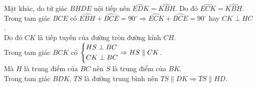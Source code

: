 \begin{ex}
{\begin{enumerate}
		Mặt khác, do tứ giác $BHDE$ nội tiếp nên $\widehat{EDK}=\widehat{KBH}$. Do đó $\widehat{ECK}=\widehat{KBH}$.\\
		Trong tam giác $BCE$ có $\widehat{EBH}+\widehat{BCE}=90^\circ \Rightarrow \widehat{ECK}+\widehat{BCE}=90^\circ$ hay $CK \perp HC$.\\
		Do đó $CK$ là tiếp tuyến của đường tròn đường kính $CH$.\\
		Trong tam giác $BCK$ có $\left\{\begin{aligned}&HS\perp BC\\&CK \perp BC\end{aligned}\right. \Rightarrow HS \parallel CK$.\\
		Mà $H$ là trung điểm của $BC$ nên $S$ là trung điểm của $BK$.\\
		Trong tam giác $BDK$, $TS$ là đường trung bình nên $TS\parallel DK \Rightarrow TS \parallel HD$. 
		\end{enumerate}
	 
		}
\end{ex}

